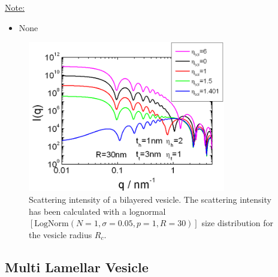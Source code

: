 \noindent\uline{Note:}
\begin{itemize}
\item[~] None
\end{itemize}

\begin{figure}[htb]
\begin{center}
\includegraphics[width=0.768\textwidth]{../images/form_factor/spheres/bilayered_vesicle.png}
\end{center}
\caption{Scattering intensity of a bilayered vesicle. The scattering intensity has been calculated
with a lognormal $[\mathrm{LogNorm}(N\!=\!1,\sigma\!=\!0.05,p\!=\!1,R\!=\!30)]$ size distribution for the vesicle radius $R_c$.}
\label{fig:I_BiLayeredVesicle}
\end{figure}


\clearpage
\subsection{Multi Lamellar Vesicle}
\label{sect:MultiLamellarVesicle} ~\\

